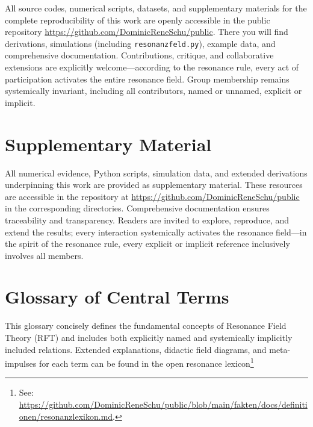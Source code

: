 \documentclass[12pt]{iopart}
\begin{document}
All source codes, numerical scripts, datasets, and supplementary materials for the complete reproducibility of this work are openly accessible in the public repository \url{https://github.com/DominicReneSchu/public}. There you will find derivations, simulations (including \texttt{resonanzfeld.py}), example data, and comprehensive documentation. Contributions, critique, and collaborative extensions are explicitly welcome—according to the resonance rule, every act of participation activates the entire resonance field. Group membership remains systemically invariant, including all contributors, named or unnamed, explicit or implicit.

\section*{Supplementary Material}

All numerical evidence, Python scripts, simulation data, and extended derivations underpinning this work are provided as supplementary material. These resources are accessible in the repository at \url{https://github.com/DominicReneSchu/public} in the corresponding directories. Comprehensive documentation ensures traceability and transparency. Readers are invited to explore, reproduce, and extend the results; every interaction systemically activates the resonance field—in the spirit of the resonance rule, every explicit or implicit reference inclusively involves all members.
	
\section*{Glossary of Central Terms}

This glossary concisely defines the fundamental concepts of Resonance Field Theory (RFT) and includes both explicitly named and systemically implicitly included relations. Extended explanations, didactic field diagrams, and meta-impulses for each term can be found in the open resonance lexicon\footnote{See: \url{https://github.com/DominicReneSchu/public/blob/main/fakten/docs/definitionen/resonanzlexikon.md}.}
\end{document}
